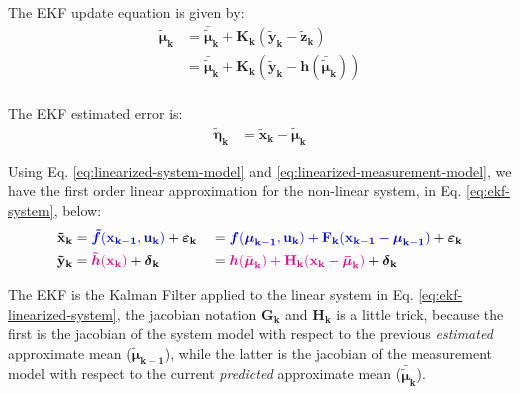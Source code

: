 \documentclass[12pt]{article}
\newcommand{\bvec}[1]{\mathbf{#1}} %
\newcommand{\mat}[1]{\mathbf{#1}}
\newcommand{\parentheses}[1]{\left(#1\right)}
\newcommand{\mb}[1]{{\boldsymbol{#1}}} %
\newcommand{\blue}[1]{\color{blue}#1\color{black}}
\newcommand{\magenta}[1]{\color{magenta}#1\color{black}}
\begin{document}
The EKF update equation is given by:
\begin{equation}
\begin{aligned}
    \mb{\tilde\mu}_\mathbf{k} &= \mb{\bar{\tilde\mu}}_\mathbf{k} + \mat{K_k}\parentheses{\bvec{\tilde{y}_k} - \bvec{\tilde{z}_k}}\\
    &= \mb{\bar{\tilde\mu}}_\mathbf{k} + \mat{K_k}\parentheses{\bvec{\tilde{y}_k} - \mb{h}(\mb{\bar{\tilde\mu}}_\mathbf{k})}\\
    \label{eq:ekf-update}
\end{aligned}
\end{equation}

The EKF estimated error is:
\begin{equation}
\begin{aligned}
    \mb{\tilde\eta}_\mathbf{k} &= \bvec{\tilde{x}_k} - \mb{\tilde{\mu}}_\mathbf{k}
\end{aligned}
\end{equation}

Using Eq. \ref{eq:linearized-system-model} and \ref{eq:linearized-measurement-model}, we have the first order linear approximation for the non-linear system, in Eq. \ref{eq:ekf-system}, below:
\begin{equation}
    \begin{aligned}
        \bvec{\tilde{x}_k} &= \blue{\mb{\tilde{f}}(\bvec{x_{k-1}, u_k})} + \mb{\varepsilon}_\mathbf{k} &&= \blue{\mb{f}(\mb{\mu}_\mathbf{k-1}, \bvec{u_k}) + \mat{F_k} (\bvec{x_{k-1}} - \mb{\mu}_\mathbf{k-1})} + \mb{\varepsilon}_\mathbf{k}\\
        \bvec{\tilde{y}_k} &= \magenta{\mb{\tilde{h}}(\bvec{x_k})} + \mb{\delta}_\mathbf{k} &&= \magenta{\mb{h}(\bar{\mb{\mu}}_\mathbf{k}) + \mat{H_k} (\bvec{x_k} - \mb{\bar{\mu}}_\mathbf{k})} + \mb{\delta}_\mathbf{k}\\
    \end{aligned}
    \label{eq:ekf-linearized-system}
\end{equation}

The EKF is the Kalman Filter applied to the linear system in Eq. \ref{eq:ekf-linearized-system}, the jacobian notation $\mat{G_k}$ and $\mat{H_k}$ is a little trick, because the first is the jacobian of the system model with respect to the previous \emph{estimated} approximate mean ($\mb{\tilde\mu}_\mathbf{k-1}$), while the latter is the jacobian of the measurement model with respect to the current \emph{predicted} approximate mean ($\mb{\bar{\tilde\mu}}_\mathbf{k}$).
\end{document}
